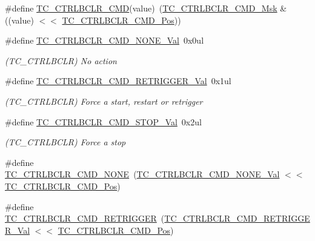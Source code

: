 \begin{DoxyCompactItemize}
\item 
\#define \mbox{\hyperlink{group___s_a_m_d21___t_c_ga2380e2dc3ff978035a625abf623e7ba3}{T\+C\+\_\+\+C\+T\+R\+L\+B\+C\+L\+R\+\_\+\+C\+MD}}(value)~(\mbox{\hyperlink{group___s_a_m_d21___t_c_ga83a38a9f59c450732e0546c3d4cd228d}{T\+C\+\_\+\+C\+T\+R\+L\+B\+C\+L\+R\+\_\+\+C\+M\+D\+\_\+\+Msk}} \& ((value) $<$$<$ \mbox{\hyperlink{group___s_a_m_d21___t_c_gab48aaea729baf61fabeb52131fb7aac2}{T\+C\+\_\+\+C\+T\+R\+L\+B\+C\+L\+R\+\_\+\+C\+M\+D\+\_\+\+Pos}}))
\item 
\#define \mbox{\hyperlink{group___s_a_m_d21___t_c_ga13574095985ab7e7e6565d52278521ce}{T\+C\+\_\+\+C\+T\+R\+L\+B\+C\+L\+R\+\_\+\+C\+M\+D\+\_\+\+N\+O\+N\+E\+\_\+\+Val}}~0x0ul
\begin{DoxyCompactList}\small\item\em (T\+C\+\_\+\+C\+T\+R\+L\+B\+C\+LR) No action \end{DoxyCompactList}\item 
\#define \mbox{\hyperlink{group___s_a_m_d21___t_c_ga5001acd1fad5be8f189902a3f7829d59}{T\+C\+\_\+\+C\+T\+R\+L\+B\+C\+L\+R\+\_\+\+C\+M\+D\+\_\+\+R\+E\+T\+R\+I\+G\+G\+E\+R\+\_\+\+Val}}~0x1ul
\begin{DoxyCompactList}\small\item\em (T\+C\+\_\+\+C\+T\+R\+L\+B\+C\+LR) Force a start, restart or retrigger \end{DoxyCompactList}\item 
\#define \mbox{\hyperlink{group___s_a_m_d21___t_c_ga292d724ca99517e1c24fb52c4757b0cb}{T\+C\+\_\+\+C\+T\+R\+L\+B\+C\+L\+R\+\_\+\+C\+M\+D\+\_\+\+S\+T\+O\+P\+\_\+\+Val}}~0x2ul
\begin{DoxyCompactList}\small\item\em (T\+C\+\_\+\+C\+T\+R\+L\+B\+C\+LR) Force a stop \end{DoxyCompactList}\item 
\#define \mbox{\hyperlink{group___s_a_m_d21___t_c_ga3e4d1fb25b06b8f9e8176efeb0f172f5}{T\+C\+\_\+\+C\+T\+R\+L\+B\+C\+L\+R\+\_\+\+C\+M\+D\+\_\+\+N\+O\+NE}}~(\mbox{\hyperlink{group___s_a_m_d21___t_c_ga13574095985ab7e7e6565d52278521ce}{T\+C\+\_\+\+C\+T\+R\+L\+B\+C\+L\+R\+\_\+\+C\+M\+D\+\_\+\+N\+O\+N\+E\+\_\+\+Val}}      $<$$<$ \mbox{\hyperlink{group___s_a_m_d21___t_c_gab48aaea729baf61fabeb52131fb7aac2}{T\+C\+\_\+\+C\+T\+R\+L\+B\+C\+L\+R\+\_\+\+C\+M\+D\+\_\+\+Pos}})
\item 
\#define \mbox{\hyperlink{group___s_a_m_d21___t_c_gaa1bb3ba6941667023ad14a2bce747e69}{T\+C\+\_\+\+C\+T\+R\+L\+B\+C\+L\+R\+\_\+\+C\+M\+D\+\_\+\+R\+E\+T\+R\+I\+G\+G\+ER}}~(\mbox{\hyperlink{group___s_a_m_d21___t_c_ga5001acd1fad5be8f189902a3f7829d59}{T\+C\+\_\+\+C\+T\+R\+L\+B\+C\+L\+R\+\_\+\+C\+M\+D\+\_\+\+R\+E\+T\+R\+I\+G\+G\+E\+R\+\_\+\+Val}} $<$$<$ \mbox{\hyperlink{group___s_a_m_d21___t_c_gab48aaea729baf61fabeb52131fb7aac2}{T\+C\+\_\+\+C\+T\+R\+L\+B\+C\+L\+R\+\_\+\+C\+M\+D\+\_\+\+Pos}})
$$
\end{DoxyCompactItemize}

